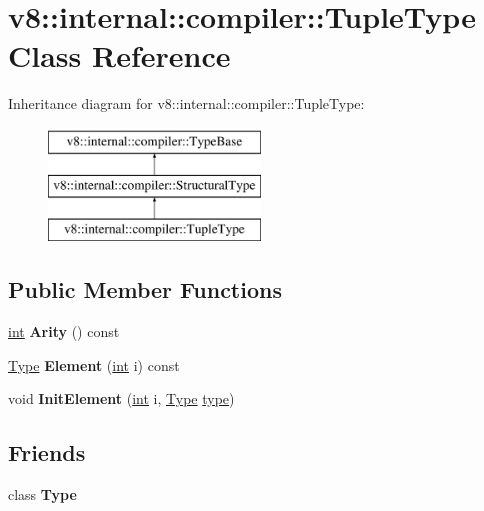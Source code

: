 \hypertarget{classv8_1_1internal_1_1compiler_1_1TupleType}{}\section{v8\+:\+:internal\+:\+:compiler\+:\+:Tuple\+Type Class Reference}
\label{classv8_1_1internal_1_1compiler_1_1TupleType}
Inheritance diagram for v8\+:\+:internal\+:\+:compiler\+:\+:Tuple\+Type\+:\begin{figure}[H]
\begin{center}
\leavevmode
\includegraphics[height=3.000000cm]{classv8_1_1internal_1_1compiler_1_1TupleType}
\end{center}
\end{figure}
\subsection*{Public Member Functions}
\begin{DoxyCompactItemize}
\item 
\mbox{\label{classv8_1_1internal_1_1compiler_1_1TupleType_a76498d628e3b199215122ec5604ecd3c}} 
\mbox{\hyperlink{classint}{int}} {\bfseries Arity} () const
\item 
\mbox{\label{classv8_1_1internal_1_1compiler_1_1TupleType_ad668dce1154f495e5b6ac278c58e6182}} 
\mbox{\hyperlink{classv8_1_1internal_1_1compiler_1_1Type}{Type}} {\bfseries Element} (\mbox{\hyperlink{classint}{int}} i) const
\item 
\mbox{\label{classv8_1_1internal_1_1compiler_1_1TupleType_a25fac54d726056161990e505a8255074}} 
void {\bfseries Init\+Element} (\mbox{\hyperlink{classint}{int}} i, \mbox{\hyperlink{classv8_1_1internal_1_1compiler_1_1Type}{Type}} \mbox{\hyperlink{classstd_1_1conditional_1_1type}{type}})
\end{DoxyCompactItemize}
\subsection*{Friends}
\begin{DoxyCompactItemize}
\item 
\mbox{\label{classv8_1_1internal_1_1compiler_1_1TupleType_a18dba29b4f3e91d6d2bc53472a6bb7cc}} 
class {\bfseries Type}
\end{DoxyCompactItemize}
